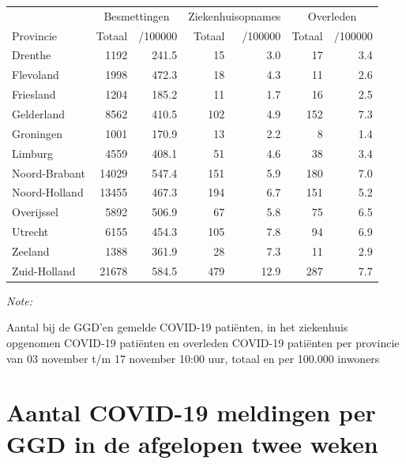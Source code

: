 \documentclass[
  english,
  man,floatsintext]{apa6}
\begin{document}
\begin{table}[H]
\centering
\begin{threeparttable}
\begin{tabular}{lrrrrrr}
\toprule
\multicolumn{1}{c}{ } & \multicolumn{2}{c}{Besmettingen} & \multicolumn{2}{c}{Ziekenhuisopnames} & \multicolumn{2}{c}{Overleden} \\
\cmidrule(l{3pt}r{3pt}){2-3} \cmidrule(l{3pt}r{3pt}){4-5} \cmidrule(l{3pt}r{3pt}){6-7}
Provincie & Totaal & /100000 & Totaal & /100000 & Totaal & /100000\\
\midrule
Drenthe & 1192 & 241.5 & 15 & 3.0 & 17 & 3.4\\
Flevoland & 1998 & 472.3 & 18 & 4.3 & 11 & 2.6\\
Friesland & 1204 & 185.2 & 11 & 1.7 & 16 & 2.5\\
Gelderland & 8562 & 410.5 & 102 & 4.9 & 152 & 7.3\\
Groningen & 1001 & 170.9 & 13 & 2.2 & 8 & 1.4\\
Limburg & 4559 & 408.1 & 51 & 4.6 & 38 & 3.4\\
Noord-Brabant & 14029 & 547.4 & 151 & 5.9 & 180 & 7.0\\
Noord-Holland & 13455 & 467.3 & 194 & 6.7 & 151 & 5.2\\
Overijssel & 5892 & 506.9 & 67 & 5.8 & 75 & 6.5\\
Utrecht & 6155 & 454.3 & 105 & 7.8 & 94 & 6.9\\
Zeeland & 1388 & 361.9 & 28 & 7.3 & 11 & 2.9\\
Zuid-Holland & 21678 & 584.5 & 479 & 12.9 & 287 & 7.7\\
\bottomrule
\end{tabular}
\begin{tablenotes}
\item \textit{Note: } 
\item Aantal bij de GGD’en gemelde COVID-19 patiënten, in het ziekenhuis opgenomen COVID-19 patiënten en overleden COVID-19 patiënten per provincie van 03 november t/m 17 november 10:00 uur, totaal en per 100.000 inwoners
\end{tablenotes}
\end{threeparttable}
\end{table}

\newpage

\hypertarget{aantal-covid-19-meldingen-per-ggd-in-de-afgelopen-twee-weken}{%
\section{Aantal COVID-19 meldingen per GGD in de afgelopen twee weken}\label{aantal-covid-19-meldingen-per-ggd-in-de-afgelopen-twee-weken}}
\end{document}
